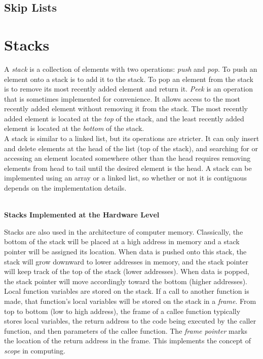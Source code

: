 \subsection{Skip Lists}

\section{Stacks}

A \textit{stack} is a collection of elements with two operations: \textit{push} and \textit{pop}. To push an element onto a stack is to add it to the stack. To pop an element from the stack is to remove its most recently added element and return it. \textit{Peek} is an operation that is sometimes implemented for convenience. It allows access to the most recently added element without removing it from the stack. The most recently added element is located at the \textit{top} of the stack, and the least recently added element is located at the \textit{bottom} of the stack. \\

A stack is similar to a linked list, but its operations are stricter. It can only insert and delete elements at the head of the list (top of the stack), and searching for or accessing an element located somewhere other than the head requires removing elements from head to tail until the desired element is the head. A stack can be implemented using an array or a linked list, so whether or not it is contiguous depends on the implementation details. \\\\

\begin{tcolorbox}[enhanced, colback=textbook-blue, sharp corners]
    \vspace{2mm}
    \begin{center}
        \textbf{Stacks Implemented at the Hardware Level}
    \end{center}
    \vspace{1mm}
    Stacks are also used in the architecture of computer memory. Classically, the bottom of the stack will be placed at a high address in memory and a stack pointer will be assigned its location. When data is pushed onto this stack, the stack will grow downward to lower addresses in memory, and the stack pointer will keep track of the top of the stack (lower addresses). When data is popped, the stack pointer will move accordingly toward the bottom (higher addresses). \\
    
    Local function variables are stored on the stack. If a call to another function is made, that function's local variables will be stored on the stack in a \textit{frame}. From top to bottom (low to high address), the frame of a callee function typically stores local variables, the return address to the code being executed by the caller function, and then parameters of the callee function. The \textit{frame pointer} marks the location of the return address in the frame. This implements the concept of \textit{scope} in computing. \\
\end{tcolorbox}
\vspace{7mm}

